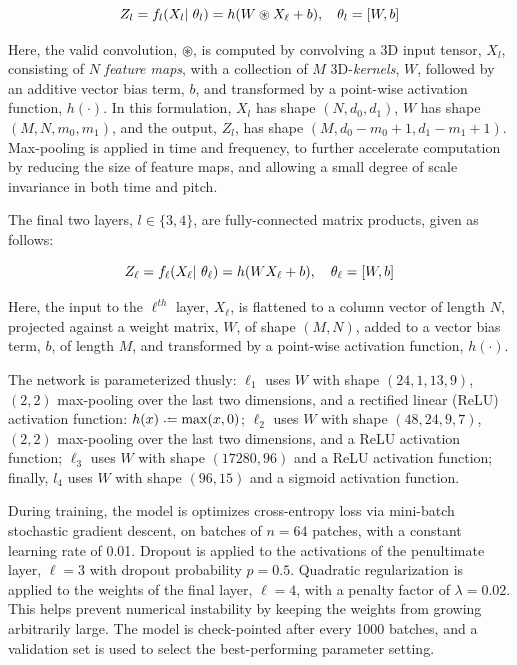 \documentclass{article}
\begin{document}
\begin{equation}
\label{eq:convlayer}
\small
Z_l = f_l(X_l \given \theta_l) = h(W \circledast X_\ell + b), \quad \theta_l = [W, b]
\end{equation}

\noindent Here, the valid convolution, $\circledast$, is computed by convolving a 3D input tensor, $X_l$, consisting of $N$ \emph{feature maps}, with a collection of $M$ 3D-\emph{kernels}, $W$, followed by an additive vector bias term, $b$, and transformed by a point-wise activation function, $h(\cdot)$.
In this formulation, $X_l$ has shape $(N, d_0, d_1)$, $W$ has shape $(M, N, m_0, m_1)$, and the output, $Z_l$, has shape $(M, d_0-m_0+1, d_1-m_1+1)$.
Max-pooling is applied in time and frequency, to further accelerate computation by reducing the size of feature maps, and allowing a small degree of scale invariance in both time and pitch.

The final two layers, $l \in \{3, 4\}$, are fully-connected matrix products, given as follows:

\begin{equation}
\label{eq:fclayer}
Z_\ell = f_\ell(X_\ell |~ \theta_\ell) = h( WX_\ell + b), \quad \theta_\ell = [W, b]
\end{equation}

\noindent Here, the input to the $\ell^{th}$ layer, $X_\ell$, is flattened to a column vector of length $N$, projected against a weight matrix, $W$, of shape $(M, N)$, added to a vector bias term, $b$, of length $M$, and transformed by a point-wise activation function, $h(\cdot)$.

The network is parameterized thusly:
$\ell_1$ uses $W$ with shape $(24, 1, 13, 9)$, $(2, 2)$ max-pooling over the last two
dimensions, and a rectified linear (ReLU) activation function: $h(x) \defeq \max(x, 0)$;
$\ell_2$ uses $W$ with shape $(48, 24, 9, 7)$, $(2, 2)$ max-pooling over the last two dimensions, and a ReLU activation function;
$\ell_3$ uses $W$ with shape $(17280, 96)$ and a ReLU activation function;
finally, $l_4$ uses $W$ with shape $(96, 15)$ and a sigmoid activation function.

During training, the model is optimizes cross-entropy loss via mini-batch stochastic
gradient descent, on batches of $n=64$ patches, with a constant learning rate of 0.01.
Dropout is applied to the activations of the penultimate layer, $\ell=3$ with dropout
probability $p=0.5$.
Quadratic regularization is applied to the weights of the final layer, $\ell=4$, with a
penalty factor of $\lambda=0.02$. This helps prevent numerical instability by keeping
the weights from growing arbitrarily large.
The model is check-pointed after every 1000 batches, and a validation set is used to
select the best-performing parameter setting.
\end{document}
